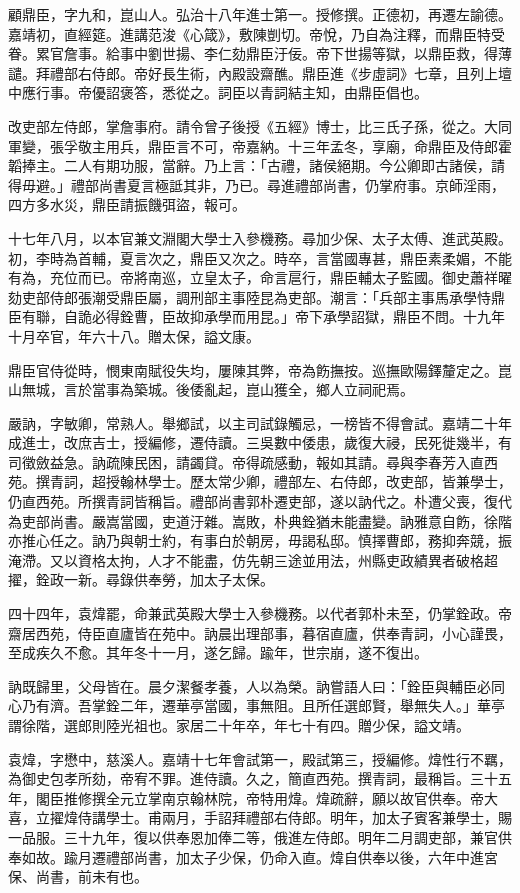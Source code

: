 \begin{pinyinscope}
顧鼎臣，字九和，崑山人。弘治十八年進士第一。授修撰。正德初，再遷左諭德。嘉靖初，直經筵。進講范浚《心箴》，敷陳剴切。帝悅，乃自為注釋，而鼎臣特受眷。累官詹事。給事中劉世揚、李仁劾鼎臣汙佞。帝下世揚等獄，以鼎臣救，得薄譴。拜禮部右侍郎。帝好長生術，內殿設齋醮。鼎臣進《步虛詞》七章，且列上壇中應行事。帝優詔褒答，悉從之。詞臣以青詞結主知，由鼎臣倡也。

改吏部左侍郎，掌詹事府。請令曾子後授《五經》博士，比三氏子孫，從之。大同軍變，張孚敬主用兵，鼎臣言不可，帝嘉納。十三年孟冬，享廟，命鼎臣及侍郎霍韜捧主。二人有期功服，當辭。乃上言：「古禮，諸侯絕期。今公卿即古諸侯，請得毋避。」禮部尚書夏言極詆其非，乃已。尋進禮部尚書，仍掌府事。京師淫雨，四方多水災，鼎臣請振饑弭盜，報可。

十七年八月，以本官兼文淵閣大學士入參機務。尋加少保、太子太傅、進武英殿。初，李時為首輔，夏言次之，鼎臣又次之。時卒，言當國專甚，鼎臣素柔媚，不能有為，充位而已。帝將南巡，立皇太子，命言扈行，鼎臣輔太子監國。御史蕭祥曜劾吏部侍郎張潮受鼎臣屬，調刑部主事陸昆為吏部。潮言：「兵部主事馬承學恃鼎臣有聯，自詭必得銓曹，臣故抑承學而用昆。」帝下承學詔獄，鼎臣不問。十九年十月卒官，年六十八。贈太保，謚文康。

鼎臣官侍從時，憫東南賦役失均，屢陳其弊，帝為飭撫按。巡撫歐陽鐸釐定之。崑山無城，言於當事為築城。後倭亂起，崑山獲全，鄉人立祠祀焉。

嚴訥，字敏卿，常熟人。舉鄉試，以主司試錄觸忌，一榜皆不得會試。嘉靖二十年成進士，改庶吉士，授編修，遷侍讀。三吳數中倭患，歲復大祲，民死徙幾半，有司徵斂益急。訥疏陳民困，請蠲貸。帝得疏感動，報如其請。尋與李春芳入直西苑。撰青詞，超授翰林學士。歷太常少卿，禮部左、右侍郎，改吏部，皆兼學士，仍直西苑。所撰青詞皆稱旨。禮部尚書郭朴遷吏部，遂以訥代之。朴遭父喪，復代為吏部尚書。嚴嵩當國，吏道汙雜。嵩敗，朴典銓猶未能盡變。訥雅意自飭，徐階亦推心任之。訥乃與朝士約，有事白於朝房，毋謁私邸。慎擇曹郎，務抑奔競，振淹滯。又以資格太拘，人才不能盡，仿先朝三途並用法，州縣吏政績異者破格超擢，銓政一新。尋錄供奉勞，加太子太保。

四十四年，袁煒罷，命兼武英殿大學士入參機務。以代者郭朴未至，仍掌銓政。帝齋居西苑，侍臣直廬皆在苑中。訥晨出理部事，暮宿直廬，供奉青詞，小心謹畏，至成疾久不愈。其年冬十一月，遂乞歸。踰年，世宗崩，遂不復出。

訥既歸里，父母皆在。晨夕潔餐孝養，人以為榮。訥嘗語人曰：「銓臣與輔臣必同心乃有濟。吾掌銓二年，遷華亭當國，事無阻。且所任選郎賢，舉無失人。」華亭謂徐階，選郎則陸光祖也。家居二十年卒，年七十有四。贈少保，謚文靖。

袁煒，字懋中，慈溪人。嘉靖十七年會試第一，殿試第三，授編修。煒性行不羈，為御史包孝所劾，帝宥不罪。進侍讀。久之，簡直西苑。撰青詞，最稱旨。三十五年，閣臣推修撰全元立掌南京翰林院，帝特用煒。煒疏辭，願以故官供奉。帝大喜，立擢煒侍講學士。甫兩月，手詔拜禮部右侍郎。明年，加太子賓客兼學士，賜一品服。三十九年，復以供奉恩加俸二等，俄進左侍郎。明年二月調吏部，兼官供奉如故。踰月遷禮部尚書，加太子少保，仍命入直。煒自供奉以後，六年中進宮保、尚書，前未有也。


\end{pinyinscope}
